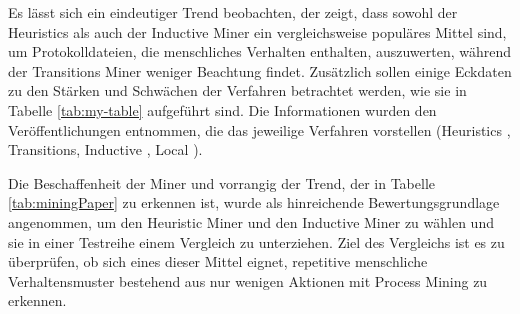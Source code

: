 Es lässt sich ein eindeutiger Trend beobachten, der zeigt, dass sowohl der Heuristics als auch der Inductive Miner ein vergleichsweise populäres Mittel sind, um Protokolldateien, die menschliches Verhalten enthalten, auszuwerten, während der Transitions Miner weniger Beachtung findet. Zusätzlich sollen einige Eckdaten zu den Stärken und Schwächen der Verfahren betrachtet werden, wie sie in Tabelle \ref{tab:my-table} aufgeführt sind. Die Informationen wurden den Veröffentlichungen entnommen, die das jeweilige Verfahren vorstellen (Heuristics \cite{heurMining}, Transitions\cite{transMiner}, Inductive \cite{inducIMining}, Local \cite{localMining}). 

\begin{table}[!h]
\centering
{}
\caption{Eigenschaften von Process Mining Verfahren zur Beurteilung ihrer Eignung für den Einsatz im Smart Home}
\label{tab:my-table}
\end{table}

Die Beschaffenheit der Miner und vorrangig der Trend, der in Tabelle \ref{tab:miningPaper} zu erkennen ist, wurde als hinreichende Bewertungsgrundlage angenommen, um den Heuristic Miner und den Inductive Miner zu wählen und sie in einer Testreihe einem Vergleich zu unterziehen. Ziel des Vergleichs ist es zu überprüfen, ob sich eines dieser Mittel eignet, repetitive menschliche Verhaltensmuster bestehend aus nur wenigen Aktionen mit Process Mining zu erkennen.

